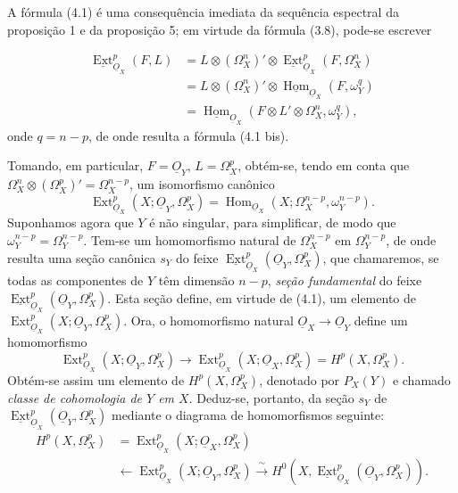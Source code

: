 \documentclass[11pt,twoside,openany]{book}
\numberwithin{equation}{section}
\newcommand{\src}[1]{%
  \phantomsection\hypertarget{src:#1}{}%
  \marginpar{\raggedleft\footnotesize\sffamily #1}%
}
\newcommand{\Osh}{\underline{O}}
\newcommand{\Homsh}{\underline{\operatorname{Hom}}}
\newcommand{\Extsh}{\underline{\operatorname{Ext}}}
\theoremstyle{plain}
\theoremstyle{definition}
\theoremstyle{remark}
\newcommand{\FgaUnitKey}{frontmatter}
\renewcommand{\src}[1]{%
  \phantomsection\hypertarget{src:\FgaUnitKey:#1}{}%
  \marginpar{\raggedleft\footnotesize\sffamily #1}%
}
\begin{document}
A fórmula (4.1) é uma consequência imediata da sequência espectral da
proposição 1 e da proposição 5; em virtude da fórmula (3.8), pode-se
escrever

\src{178}
\begin{align*}
\Extsh_{\Osh_X}^{p}(F,L)
&=L\otimes(\Omega_X^{n})'\otimes
  \Extsh_{\Osh_X}^{p}(F,\Omega_X^{n})\\
&=L\otimes(\Omega_X^{n})'\otimes
  \Homsh_{\Osh_X}(F,\omega_Y^{q})\\
&=\Homsh_{\Osh_X}\!\left(
  F\otimes L'\otimes\Omega_X^{n},\omega_Y^{q}\right),
\end{align*}
onde $q=n-p$, de onde resulta a fórmula (4.1 bis).

Tomando, em particular, $F=\Osh_Y$, $L=\Omega_X^{p}$, obtém-se, tendo em conta
que $\Omega_X^{n}\otimes(\Omega_X^{p})'=\Omega_X^{n-p}$, um isomorfismo
canônico
\begin{equation}\tag{4.2}
  \operatorname{Ext}_{\Osh_X}^{p}(X;\Osh_Y,\Omega_X^{p})
  =\operatorname{Hom}_{\Osh_X}
  (X;\Omega_X^{n-p},\omega_Y^{n-p}).
\end{equation}
Suponhamos agora que $Y$ é não singular, para simplificar, de modo que
$\omega_Y^{n-p}=\Omega_Y^{n-p}$. Tem-se um homomorfismo natural de
$\Omega_X^{n-p}$ em $\Omega_Y^{n-p}$, de onde resulta uma seção canônica $s_Y$ do
feixe $\Extsh_{\Osh_X}^{p}(\Osh_Y,\Omega_X^{p})$, que chamaremos, se
todas as componentes de $Y$ têm dimensão $n-p$, \emph{seção
fundamental} do feixe $\Extsh_{\Osh_X}^{p}(\Osh_Y,\Omega_X^{p})$. Esta
seção define, em virtude de (4.1), um elemento de
$\operatorname{Ext}_{\Osh_X}^{p}(X;\Osh_Y,\Omega_X^{p})$. Ora, o homomorfismo
natural $\Osh_X\longrightarrow\Osh_Y$ define um homomorfismo
\[
  \operatorname{Ext}_{\Osh_X}^{p}(X;\Osh_Y,\Omega_X^{p})
  \longrightarrow
  \operatorname{Ext}_{\Osh_X}^{p}(X;\Osh_X,\Omega_X^{p})
  =H^{p}(X,\Omega_X^{p}).
\]
Obtém-se assim um elemento de $H^{p}(X,\Omega_X^{p})$, denotado por $P_X(Y)$ e chamado
\emph{classe de cohomologia de $Y$ em $X$}. Deduz-se, portanto, da seção
$s_Y$ de $\Extsh_{\Osh_X}^{p}(\Osh_Y,\Omega_X^{p})$ mediante o diagrama
de homomorfismos seguinte:
\begin{equation}\tag{4.3}
\begin{aligned}
H^{p}(X,\Omega_X^{p})
&=\operatorname{Ext}_{\Osh_X}^{p}(X;\Osh_X,\Omega_X^{p})\\
&\longleftarrow\operatorname{Ext}_{\Osh_X}^{p}(X;\Osh_Y,\Omega_X^{p})
\xrightarrow{\ \sim\ }
H^{0}\!\left(X,\Extsh_{\Osh_X}^{p}(\Osh_Y,\Omega_X^{p})\right).
\end{aligned}
\end{equation}
\end{document}
